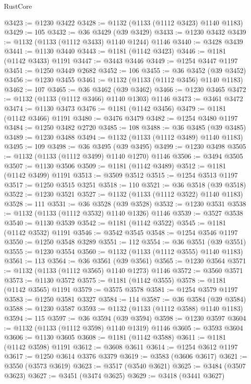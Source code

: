 \begin{lexlean}{RustCore}
\begin{coremodule}
@3423 := @1230 @3422
@3428 := @1132 (@1133 (@1112 @3423) @1140 @1183)
@3429 := 105
@3432 := @36 @3429 (@39 @3429)
@3433 := @1230 @3432
@3439 := @1132 (@1133 (@1112 @3433) @1140 @1244) @1146
@3440 := @3428 @3439
@3441 := @1130 @3440
@3443 := @1181 (@1142 @3423)
@3446 := @1181 (@1142 @3433) @1191
@3447 := @3443 @3446
@3449 := @1254 @3447 @1197
@3451 := @1250 @3449 @2682
@3452 := 106
@3455 := @36 @3452 (@39 @3452)
@3456 := @1230 @3455
@3461 := @1132 (@1133 (@1112 @3456) @1140 @1183)
@3462 := 107
@3465 := @36 @3462 (@39 @3462)
@3466 := @1230 @3465
@3472 := @1132 (@1133 (@1112 @3466) @1140 @1303) @1146
@3473 := @3461 @3472
@3474 := @1130 @3473
@3476 := @1181 (@1142 @3456)
@3479 := @1181 (@1142 @3466) @1191
@3480 := @3476 @3479
@3482 := @1254 @3480 @1197
@3484 := @1250 @3482 @2720
@3485 := 108
@3488 := @36 @3485 (@39 @3485)
@3489 := @1230 @3488
@3494 := @1132 (@1133 (@1112 @3489) @1140 @1183)
@3495 := 109
@3498 := @36 @3495 (@39 @3495)
@3499 := @1230 @3498
@3505 := @1132 (@1133 (@1112 @3499) @1140 @1270) @1146
@3506 := @3494 @3505
@3507 := @1130 @3506
@3509 := @1181 (@1142 @3489)
@3512 := @1181 (@1142 @3499) @1191
@3513 := @3509 @3512
@3515 := @1254 @3513 @1197
@3517 := @1250 @3515 @3251
@3518 := 110
@3521 := @36 @3518 (@39 @3518)
@3522 := @1230 @3521
@3527 := @1132 (@1133 (@1112 @3522) @1140 @1183)
@3528 := 111
@3531 := @36 @3528 (@39 @3528)
@3532 := @1230 @3531
@3538 := @1132 (@1133 (@1112 @3532) @1140 @1326) @1146
@3539 := @3527 @3538
@3540 := @1130 @3539
@3542 := @1181 (@1142 @3522)
@3545 := @1181 (@1142 @3532) @1191
@3546 := @3542 @3545
@3548 := @1254 @3546 @1197
@3550 := @1250 @3548 @3289
@3551 := 112
@3554 := @36 @3551 (@39 @3551)
@3555 := @1230 @3554
@3560 := @1132 (@1133 (@1112 @3555) @1140 @1183)
@3561 := 113
@3564 := @36 @3561 (@39 @3561)
@3565 := @1230 @3564
@3571 := @1132 (@1133 (@1112 @3565) @1140 @1273) @1146
@3572 := @3560 @3571
@3573 := @1130 @3572
@3575 := @1181 (@1142 @3555)
@3578 := @1181 (@1142 @3565) @1191
@3579 := @3575 @3578
@3581 := @1254 @3579 @1197
@3583 := @1250 @3581 @3327
@3584 := 114
@3587 := @36 @3584 (@39 @3584)
@3588 := @1230 @3587
@3593 := @1132 (@1133 (@1112 @3588) @1140 @1183)
@3594 := 115
@3597 := @36 @3594 (@39 @3594)
@3598 := @1230 @3597
@3604 := @1132 (@1133 (@1112 @3598) @1140 @1319) @1146
@3605 := @3593 @3604
@3606 := @1130 @3605
@3608 := @1181 (@1142 @3588)
@3611 := @1181 (@1142 @3598) @1191
@3612 := @3608 @3611
@3614 := @1254 @3612 @1197
@3617 := @1250 @3614 @3376 @3379
@3619 := @3583 (@3606 @3617)
@3621 := @3550 (@3573 @3619)
@3623 := @3517 (@3540 @3621)
@3625 := @3484 (@3507 @3623)
@3627 := @3451 (@3474 @3625)
@3629 := @3418 (@3441 @3627)

\end{coremodule}
\end{lexlean}

